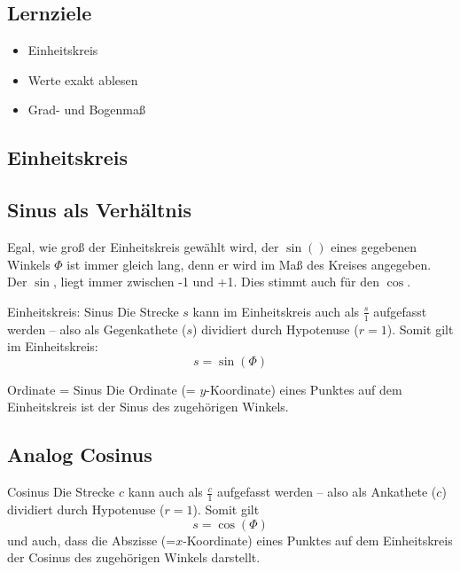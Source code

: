 \subsection*{Lernziele}

\begin{itemize}
\item Einheitskreis
\item Werte exakt ablesen
\item Grad- und Bogenmaß
\end{itemize}

\newpage
\subsection{Einheitskreis}

\TRAINER{\einheitskreis{}}

\subsection{Sinus als Verhältnis}
Egal, wie groß der Einheitskreis gewählt wird, der $\sin()$ eines
gegebenen Winkels $\Phi$ ist immer gleich lang, denn er wird im Maß
des Kreises angegeben. Der $\sin{}$, liegt immer zwischen -1 und
+1. Dies stimmt auch für den $\cos{}$.

\begin{gesetz}{Einheitskreis: Sinus}{}
  Die Strecke $s$ kann im Einheitskreis auch als $\frac{s}1$ aufgefasst werden -- also
  als Gegenkathete ($s$) dividiert durch Hypotenuse ($r=1$). Somit
  gilt im Einheitskreis:
  $$s = \sin(\Phi)$$
\end{gesetz}

\begin{bemerkung}{Ordinate = Sinus}{}
  Die Ordinate (= $y$-Koordinate) eines Punktes auf dem Einheitskreis ist
  der Sinus des zugehörigen Winkels.
\end{bemerkung}
\newpage

\subsection{Analog Cosinus}
\begin{bemerkung}{Cosinus}{}
  Die Strecke $c$ kann auch als $\frac{c}1$ aufgefasst werden -- also
  als Ankathete ($c$) dividiert durch Hypotenuse ($r=1$). Somit
  gilt
  $$s = \cos(\Phi)$$
  und auch, dass die Abszisse (=$x$-Koordinate) eines Punktes auf dem
  Einheitskreis der Cosinus des zugehörigen Winkels darstellt.
\end{bemerkung}

